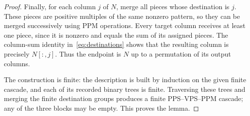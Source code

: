 \documentclass[12pt,a4paper]{article}
\begin{document}
\begin{proof}
Finally, for each column $j$ of $N$, merge all pieces whose destination
is $j$. These pieces are positive multiples of the same nonzero pattern,
so they can be merged successively using PPM operations. Every target
column receives at least one piece, since it is nonzero and equals the
sum of its assigned pieces. The column-sum identity
in~\eqref{eq:destinations} shows that the resulting column is precisely
$N[:,j]$. Thus the endpoint is $N$ up to a permutation of its output
columns.

The construction is finite: the description is built by induction on
the given finite cascade, and each of its recorded binary trees is
finite. Traversing these trees and merging the finite destination groups
produces a finite PPS--VPS--PPM cascade; any of the three blocks may be
empty. This proves the lemma.
\end{proof}
\end{document}
